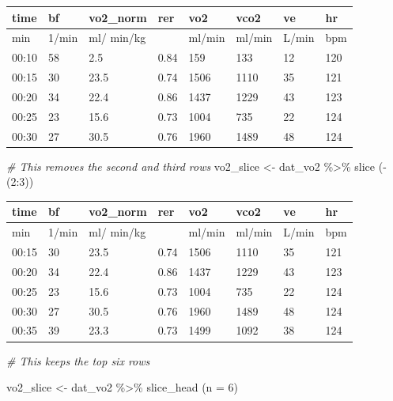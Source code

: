 \documentclass[
]{book}
\newenvironment{Shaded}{\begin{snugshade}}{\end{snugshade}}
\newcommand{\AttributeTok}[1]{\textcolor[rgb]{0.77,0.63,0.00}{#1}}
\newcommand{\CommentTok}[1]{\textcolor[rgb]{0.56,0.35,0.01}{\textit{#1}}}
\newcommand{\DecValTok}[1]{\textcolor[rgb]{0.00,0.00,0.81}{#1}}
\newcommand{\FunctionTok}[1]{\textcolor[rgb]{0.00,0.00,0.00}{#1}}
\newcommand{\NormalTok}[1]{#1}
\newcommand{\OtherTok}[1]{\textcolor[rgb]{0.56,0.35,0.01}{#1}}
\newcommand{\SpecialCharTok}[1]{\textcolor[rgb]{0.00,0.00,0.00}{#1}}
\begin{document}
\begin{tabular}{l|l|l|l|l|l|l|l}
\hline
time & bf & vo2\_norm & rer & vo2 & vco2 & ve & hr\\
\hline
min & 1/min & ml/ min/kg &  & ml/min & ml/min & L/min & bpm\\
\hline
00:10 & 58 & 2.5 & 0.84 & 159 & 133 & 12 & 120\\
\hline
00:15 & 30 & 23.5 & 0.74 & 1506 & 1110 & 35 & 121\\
\hline
00:20 & 34 & 22.4 & 0.86 & 1437 & 1229 & 43 & 123\\
\hline
00:25 & 23 & 15.6 & 0.73 & 1004 & 735 & 22 & 124\\
\hline
00:30 & 27 & 30.5 & 0.76 & 1960 & 1489 & 48 & 124\\
\hline
\end{tabular}

\begin{Shaded}
\begin{Highlighting}[]
\CommentTok{\# This removes the second and third rows}
\NormalTok{vo2\_slice }\OtherTok{\textless{}{-}}\NormalTok{ dat\_vo2 }\SpecialCharTok{\%\textgreater{}\%} 
  \FunctionTok{slice}\NormalTok{ (}\SpecialCharTok{{-}}\NormalTok{(}\DecValTok{2}\SpecialCharTok{:}\DecValTok{3}\NormalTok{))}
\end{Highlighting}
\end{Shaded}

\begin{tabular}{l|l|l|l|l|l|l|l}
\hline
time & bf & vo2\_norm & rer & vo2 & vco2 & ve & hr\\
\hline
min & 1/min & ml/ min/kg &  & ml/min & ml/min & L/min & bpm\\
\hline
00:15 & 30 & 23.5 & 0.74 & 1506 & 1110 & 35 & 121\\
\hline
00:20 & 34 & 22.4 & 0.86 & 1437 & 1229 & 43 & 123\\
\hline
00:25 & 23 & 15.6 & 0.73 & 1004 & 735 & 22 & 124\\
\hline
00:30 & 27 & 30.5 & 0.76 & 1960 & 1489 & 48 & 124\\
\hline
00:35 & 39 & 23.3 & 0.73 & 1499 & 1092 & 38 & 124\\
\hline
\end{tabular}

\begin{Shaded}
\begin{Highlighting}[]
\CommentTok{\# This keeps the top six rows}

\NormalTok{vo2\_slice }\OtherTok{\textless{}{-}}\NormalTok{ dat\_vo2 }\SpecialCharTok{\%\textgreater{}\%} 
  \FunctionTok{slice\_head}\NormalTok{ (}\AttributeTok{n =} \DecValTok{6}\NormalTok{) }
\end{Highlighting}
\end{Shaded}
\end{document}
